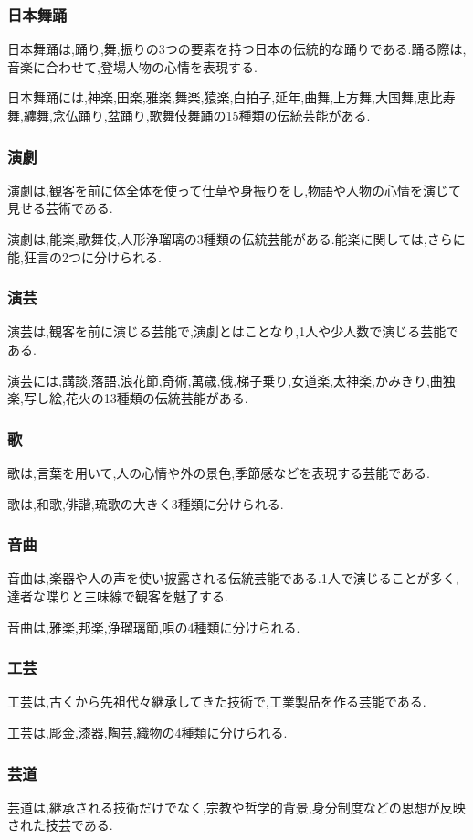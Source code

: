 \documentclass[12pt]{ltjsarticle}
\begin{document}
\subsubsection{日本舞踊}
日本舞踊は,踊り,舞,振りの3つの要素を持つ日本の伝統的な踊りである.踊る際は,音楽に合わせて,登場人物の心情を表現する.

日本舞踊には,神楽,田楽,雅楽,舞楽,猿楽,白拍子,延年,曲舞,上方舞,大国舞,恵比寿舞,纏舞,念仏踊り,盆踊り,歌舞伎舞踊の15種類の伝統芸能がある.
\subsubsection{演劇}
演劇は,観客を前に体全体を使って仕草や身振りをし,物語や人物の心情を演じて見せる芸術である.

演劇は,能楽,歌舞伎,人形浄瑠璃の3種類の伝統芸能がある.能楽に関しては,さらに能,狂言の2つに分けられる.
\subsubsection{演芸}
演芸は,観客を前に演じる芸能で,演劇とはことなり,1人や少人数で演じる芸能である.

演芸には,講談,落語,浪花節,奇術,萬歳,俄,梯子乗り,女道楽,太神楽,かみきり,曲独楽,写し絵,花火の13種類の伝統芸能がある.
\subsubsection{歌}
歌は,言葉を用いて,人の心情や外の景色,季節感などを表現する芸能である.

歌は,和歌,俳諧,琉歌の大きく3種類に分けられる.
\subsubsection{音曲}
音曲は,楽器や人の声を使い披露される伝統芸能である.1人で演じることが多く,達者な喋りと三味線で観客を魅了する.

音曲は,雅楽,邦楽,浄瑠璃節,唄の4種類に分けられる.

\subsubsection{工芸}
工芸は,古くから先祖代々継承してきた技術で,工業製品を作る芸能である.

工芸は,彫金,漆器,陶芸,織物の4種類に分けられる.

\subsubsection{芸道}
芸道は,継承される技術だけでなく,宗教や哲学的背景,身分制度などの思想が反映された技芸である.
\end{document}
